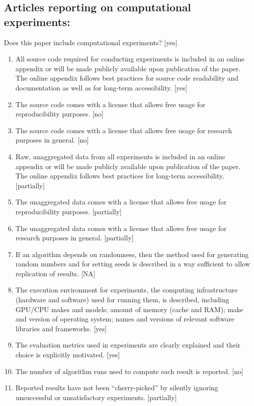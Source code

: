 \documentclass[manuscript,screen,review]{jair}
\begin{document}
\subsection*{Articles reporting on computational experiments:}
Does this paper include computational experiments? [yes]
\begin{enumerate}
    \item All source code required for conducting experiments is included in an online appendix or will be made publicly available upon publication of the paper. The online appendix follows best practices for source code readability and documentation as well as for long-term accessibility. [yes]
    \item The source code comes with a license that allows free usage for reproducibility purposes. [no]
    \item The source code comes with a license that allows free usage for research purposes in general. [no]
    \item Raw, unaggregated data from all experiments is included in an online appendix or will be made publicly available upon publication of the paper. The online appendix follows best practices for long-term accessibility. [partially]
    \item The unaggregated data comes with a license that allows free usage for reproducibility purposes. [partially]
    \item The unaggregated data comes with a license that allows free usage for research purposes in general. [partially]
    \item If an algorithm depends on randomness, then the method used for generating random numbers and for setting seeds is described in a way sufficient to allow replication of results. [NA]
    \item The execution environment for experiments, the computing infrastructure (hardware and software) used for running them, is described, including GPU/CPU makes and models; amount of memory (cache and RAM); make and version of operating system; names and versions of relevant software libraries and frameworks. [yes]
    \item The evaluation metrics used in experiments are clearly explained and their choice is explicitly motivated. [yes]
    \item The number of algorithm runs used to compute each result is reported. [no]
    \item Reported results have not been ``cherry-picked'' by silently ignoring unsuccessful or unsatisfactory experiments. [partially]

\end{enumerate}
\end{document}
